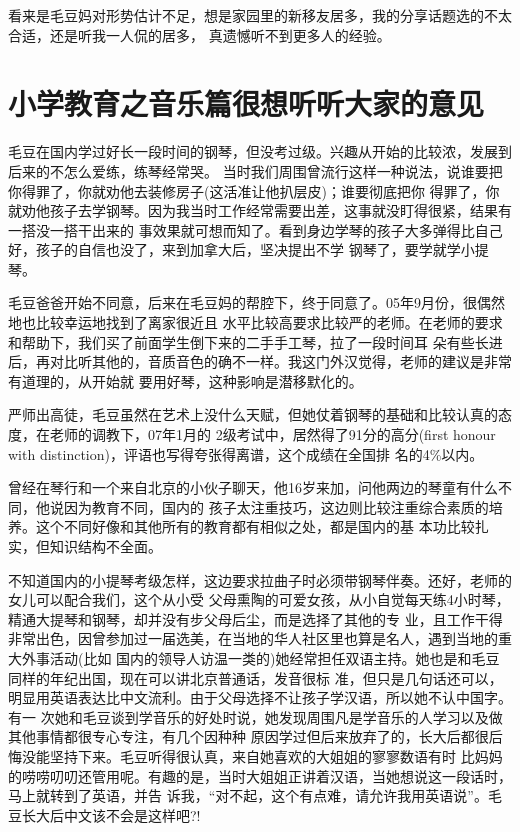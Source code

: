 \documentclass[11pt,a4paper,onecolumn]{article}
\begin{document}
看来是毛豆妈对形势估计不足，想是家园里的新移友居多，我的分享话题选的不太合适，还是听我一人侃的居多，
真遗憾听不到更多人的经验。


\section{小学教育之音乐篇\myrule 很想听听大家的意见}


毛豆在国内学过好长一段时间的钢琴，但没考过级。兴趣从开始的比较浓，发展到后来的不怎么爱练，练琴经常哭。
当时我们周围曾流行这样一种说法，说谁要把你得罪了，你就劝他去装修房子(这活准让他扒层皮)；谁要彻底把你
得罪了，你就劝他孩子去学钢琴。因为我当时工作经常需要出差，这事就没盯得很紧，结果有一搭没一搭干出来的
事效果就可想而知了。看到身边学琴的孩子大多弹得比自己好，孩子的自信也没了，来到加拿大后，坚决提出不学
钢琴了，要学就学小提琴。


毛豆爸爸开始不同意，后来在毛豆妈的帮腔下，终于同意了。05年9月份，很偶然地也比较幸运地找到了离家很近且
水平比较高要求比较严的老师。在老师的要求和帮助下，我们买了前面学生倒下来的二手手工琴，拉了一段时间耳
朵有些长进后，再对比听其他的，音质音色的确不一样。我这门外汉觉得，老师的建议是非常有道理的，从开始就
要用好琴，这种影响是潜移默化的。


严师出高徒，毛豆虽然在艺术上没什么天赋，但她仗着钢琴的基础和比较认真的态度，在老师的调教下，07年1月的
2级考试中，居然得了91分的高分(first honour with distinction)，评语也写得夸张得离谱，这个成绩在全国排
名的4\%以内。


曾经在琴行和一个来自北京的小伙子聊天，他16岁来加，问他两边的琴童有什么不同，他说因为教育不同，国内的
孩子太注重技巧，这边则比较注重综合素质的培养。这个不同好像和其他所有的教育都有相似之处，都是国内的基
本功比较扎实，但知识结构不全面。


不知道国内的小提琴考级怎样，这边要求拉曲子时必须带钢琴伴奏。还好，老师的女儿可以配合我们，这个从小受
父母熏陶的可爱女孩，从小自觉每天练4小时琴，精通大提琴和钢琴，却并没有步父母后尘，而是选择了其他的专
业，且工作干得非常出色，因曾参加过一届选美，在当地的华人社区里也算是名人，遇到当地的重大外事活动(比如
国内的领导人访温一类的)她经常担任双语主持。她也是和毛豆同样的年纪出国，现在可以讲北京普通话，发音很标
准，但只是几句话还可以，明显用英语表达比中文流利。由于父母选择不让孩子学汉语，所以她不认中国字。有一
次她和毛豆谈到学音乐的好处时说，她发现周围凡是学音乐的人学习以及做其他事情都很专心专注，有几个因种种
原因学过但后来放弃了的，长大后都很后悔没能坚持下来。毛豆听得很认真，来自她喜欢的大姐姐的寥寥数语有时
比妈妈的唠唠叨叨还管用呢。有趣的是，当时大姐姐正讲着汉语，当她想说这一段话时，马上就转到了英语，并告
诉我，``对不起，这个有点难，请允许我用英语说''。毛豆长大后中文该不会是这样吧?!
\end{document}
